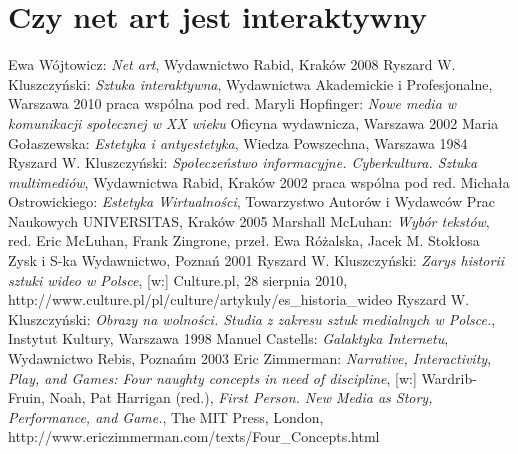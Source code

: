 \documentclass[a4paper,12pt,twoside]{article}
\begin{document}

\section{Czy net art jest interaktywny}


\begin{thebibliography}{6}
  Ewa Wójtowicz:
  \textit{Net art},
  Wydawnictwo Rabid, Kraków 2008
  Ryszard W. Kluszczyński:
  \textit{Sztuka interaktywna},
  Wydawnictwa Akademickie i Profesjonalne,
  Warszawa 2010
  praca wspólna pod red. Maryli Hopfinger:
  \textit{Nowe media w komunikacji społecznej w XX wieku}
  Oficyna wydawnicza,
  Warszawa 2002
  Maria Gołaszewska:
  \textit{Estetyka i antyestetyka},
  Wiedza Powszechna, Warszawa 1984
  Ryszard W. Kluszczyński:
  \textit{Społeczeństwo informacyjne. Cyberkultura. Sztuka multimediów},
  Wydawnictwa Rabid, Kraków 2002
  praca wspólna pod red. Michała Ostrowickiego:
  \textit{Estetyka Wirtualności},
  Towarzystwo Autorów i Wydawców Prac Naukowych UNIVERSITAS,
  Kraków 2005
  Marshall McLuhan:
  \textit{Wybór tekstów},
  red. Eric McLuhan, Frank Zingrone,
  przeł. Ewa Różalska, Jacek M. Stokłosa
  Zysk i S-ka Wydawnictwo, Poznań 2001
  Ryszard W. Kluszczyński:
  \textit{Zarys historii sztuki wideo w Polsce},
  [w:] Culture.pl, 28 sierpnia 2010,
  http://www.culture.pl/pl/culture/artykuly/es\_historia\_wideo
  Ryszard W. Kluszczyński:
  \textit{Obrazy na wolności. Studia z zakresu sztuk medialnych w Polsce.},
  Instytut Kultury, Warszawa 1998
  Manuel Castells:
  \textit{Galaktyka Internetu},
  Wydawnictwo Rebis, Poznańm 2003
  Eric Zimmerman:
  \textit{Narrative, Interactivity, Play, and Games: Four naughty concepts in need of discipline},
  [w:] Wardrib-Fruin, Noah, Pat Harrigan (red.),
  \textit{First Person. New Media as Story, Performance, and Game.},
  The MIT Press, London,
  http://www.ericzimmerman.com/texts/Four\_Concepts.html

\end{thebibliography}
\end{document}
